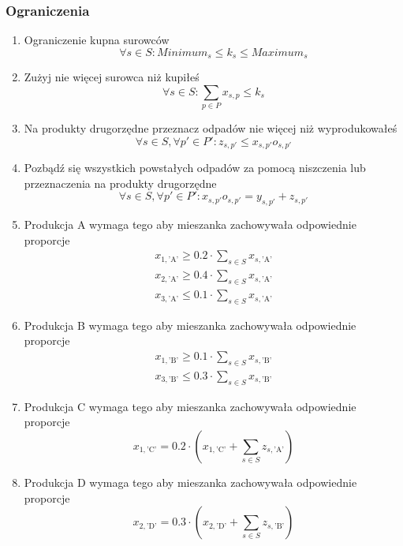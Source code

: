 \documentclass[a4paper,11pt]{article}
\theoremstyle{mytheor}
\begin{document}
\subsubsection*{Ograniczenia}
\begin{enumerate}
    \item Ograniczenie kupna surowców
          $$
              \forall s\in S: \textit{Minimum}_s \leq k_s \leq \textit{Maximum}_s
          $$
    \item Zużyj nie więcej surowca niż kupiłeś
          $$
              \forall s\in S: \sum_{p\in P} x_{s,p} \leq k_{s}
          $$
    \item Na produkty drugorzędne przeznacz odpadów nie więcej niż wyprodukowałeś
          $$
              \forall s\in S, \forall p'\in P': z_{s, p'} \leq x_{s,p'}o_{s,p'}
          $$
    \item Pozbądź się wszystkich powstałych odpadów za pomocą niszczenia lub przeznaczenia na produkty drugorzędne
          $$
              \forall s\in S, \forall p'\in P': x_{s,p'}o_{s,p'} = y_{s,p'} + z_{s,p'}
          $$
    \item Produkcja A wymaga tego aby mieszanka zachowywała odpowiednie proporcje
          \begin{gather*}
              x_{1, \text{'A'}} \geq 0.2 \cdot \sum_{s\in S} x_{s,\text{'A'}} \\
              x_{2, \text{'A'}} \geq 0.4 \cdot \sum_{s\in S} x_{s,\text{'A'}} \\
              x_{3, \text{'A'}} \leq 0.1 \cdot \sum_{s\in S} x_{s,\text{'A'}}
          \end{gather*}
    \item Produkcja B wymaga tego aby mieszanka zachowywała odpowiednie proporcje
          \begin{gather*}
              x_{1, \text{'B'}} \geq 0.1 \cdot \sum_{s\in S} x_{s,\text{'B'}} \\
              x_{3, \text{'B'}} \leq 0.3 \cdot \sum_{s\in S} x_{s,\text{'B'}}
          \end{gather*}
    \item Produkcja C wymaga tego aby mieszanka zachowywała odpowiednie proporcje
          $$
              x_{1, \text{'C'}} = 0.2 \cdot (x_{1, \text{'C'}} + \sum_{s\in S} z_{s,\text{'A'}})
          $$
    \item Produkcja D wymaga tego aby mieszanka zachowywała odpowiednie proporcje
          $$
              x_{2, \text{'D'}} = 0.3 \cdot (x_{2, \text{'D'}} + \sum_{s\in S} z_{s,\text{'B'}})
          $$
\end{enumerate}
\end{document}
